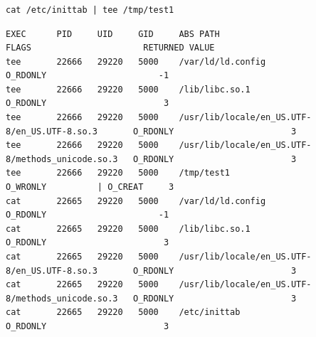 \documentclass[a4paper]{article}
\begin{document}
\subsubsection{}

 \begin{lstlisting}[style=command]
cat /etc/inittab | tee /tmp/test1
   \end{lstlisting}
\par 
\begin{lstlisting}[style=esc]
EXEC      PID     UID     GID     ABS PATH                                          FLAGS                      RETURNED VALUE
tee       22666   29220   5000    /var/ld/ld.config                                  O_RDONLY                      -1
tee       22666   29220   5000    /lib/libc.so.1                                     O_RDONLY                       3
tee       22666   29220   5000    /usr/lib/locale/en_US.UTF-8/en_US.UTF-8.so.3       O_RDONLY                       3
tee       22666   29220   5000    /usr/lib/locale/en_US.UTF-8/methods_unicode.so.3   O_RDONLY                       3
tee       22666   29220   5000    /tmp/test1                                         O_WRONLY          | O_CREAT     3
cat       22665   29220   5000    /var/ld/ld.config                                  O_RDONLY                      -1
cat       22665   29220   5000    /lib/libc.so.1                                     O_RDONLY                       3
cat       22665   29220   5000    /usr/lib/locale/en_US.UTF-8/en_US.UTF-8.so.3       O_RDONLY                       3
cat       22665   29220   5000    /usr/lib/locale/en_US.UTF-8/methods_unicode.so.3   O_RDONLY                       3
cat       22665   29220   5000    /etc/inittab                                       O_RDONLY                       3
 \end{lstlisting}

\subsubsection{}
\end{document}
